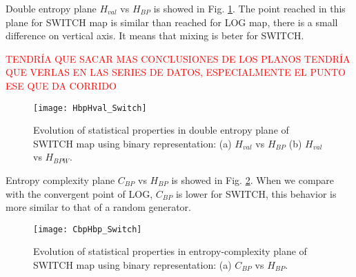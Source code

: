 Double entropy plane $H_{val}$ vs $H_{BP}$ is showed in Fig. \ref{fig:SWITCH_HH}.
The point reached in this plane for SWITCH map is similar than reached for LOG map, there is a small difference on vertical axis.
It means that mixing is beter for SWITCH.

\textcolor{red}{TENDRÍA QUE SACAR MAS CONCLUSIONES DE LOS PLANOS TENDRÍA QUE VERLAS EN LAS SERIES DE DATOS, ESPECIALMENTE EL PUNTO ESE QUE DA CORRIDO}

\begin{figure}
	\texttt{[image: HbpHval\_Switch]}
	\caption{Evolution of statistical properties in double entropy plane of SWITCH map using binary representation: (a) $H_{val}$ vs $H_{BP}$ (b) $H_{val}$ vs $H_{BPW}$.}
	\label{fig:SWITCH_HH}
\end{figure}

Entropy complexity plane $C_{BP}$ vs $H_{BP}$ is showed in Fig. \ref{fig:SWITCH_HC}.
When we compare with the convergent point of LOG, $C_{BP}$ is lower for SWITCH, this behavior is more similar to that of a random generator.

\begin{figure}
	\texttt{[image: CbpHbp\_Switch]}
	\caption{Evolution of statistical properties in entropy-complexity plane of SWITCH map using binary representation: (a) $C_{BP}$ vs $H_{BP}$.}
	\label{fig:SWITCH_HC}
\end{figure}
